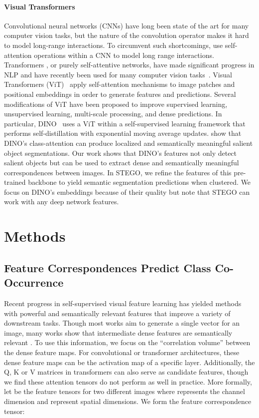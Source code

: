 \documentclass{article} \usepackage{iclr2022_conference,times}
\begin{document}
\paragraph{Visual Transformers}
Convolutional neural networks (CNNs) have long been state of the art for many computer vision tasks, but the nature of the convolution operator makes it hard to model long-range interactions. To circumvent such shortcomings, \cite{wang2018non, zhang2019self} use self-attention operations within a CNN to model long range interactions. Transformers \citep{vaswani2017attention}, or purely self-attentive networks, have made significant progress in NLP and have recently been used for many computer vision tasks~\citep{dosovitskiy2020image, touvron2021training, Ranftl2021, dino}.
Visual Transformers (ViT)~\citep{vaswani2017attention} apply self-attention mechanisms to image patches and positional embeddings in order to generate features and predictions. Several modifications of ViT have been proposed to improve supervised learning, unsupervised learning, multi-scale processing, and dense predictions. In particular, DINO~\citep{dino} uses a ViT within a self-supervised learning framework that performs self-distillation with exponential moving average updates. \cite{dino} show that DINO's class-attention can produce localized and semantically meaningful salient object segmentations. Our work shows that DINO's features not only detect salient objects but can be used to extract dense and semantically meaningful correspondences between images. In STEGO, we refine the features of this pre-trained backbone to yield semantic segmentation predictions when clustered. We focus on DINO's embeddings because of their quality but note that STEGO can work with any deep network features.

\section{Methods}

\subsection{Feature Correspondences Predict Class Co-Occurrence}
\label{sec:correspondence}





Recent progress in self-supervised visual feature learning has yielded methods with powerful and semantically relevant features that improve a variety of downstream tasks. Though most works aim to generate a single vector for an image, many works show that intermediate dense features are semantically relevant \citep{hamilton2021model,collins2018deep,cam}. To use this information, we focus on the ``correlation volume'' \citep{raft} between the dense feature maps. For convolutional or transformer architectures, these dense feature maps can be the activation map of a specific layer. Additionally, the Q, K or V matrices in transformers can also serve as candidate features, though we find these attention tensors do not perform as well in practice. More formally, let  be the feature tensors for two different images where  represents the channel dimension and  represent spatial dimensions. We form the feature correspondence tensor:
\end{document}
